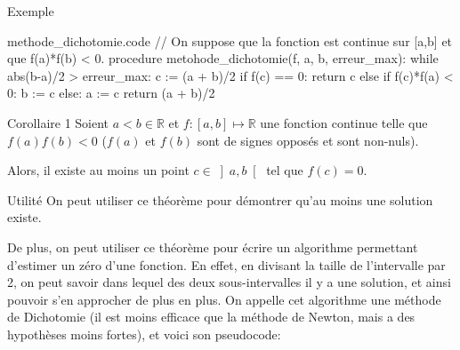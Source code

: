 \documentclass[a4paper]{article}
\begin{document}
\begin{parag}{Exemple}
\end{parag}

\begin{filecontents*}[overwrite]{methode_dichotomie.code}
// On suppose que la fonction est continue sur [a,b] et que f(a)*f(b) < 0.
procedure metohode_dichotomie(f, a, b, erreur_max):
    while abs(b-a)/2 > erreur_max:
        c := (a + b)/2
        if f(c) == 0: return c
        else if f(c)*f(a) < 0: b := c
        else: a := c
    return (a + b)/2
\end{filecontents*}


\begin{parag}{Corollaire 1}
    Soient $a < b \in \mathbb{R}$ et $f: \left[a,b\right] \mapsto \mathbb{R}$ une fonction continue telle que $f\left(a\right)f\left(b\right) < 0$ ($f\left(a\right)$ et $f\left(b\right)$ sont de signes opposés et sont non-nuls).

    Alors, il existe au moins un point $c \in \left]a, b\right[ $ tel que $f\left(c\right) = 0$. 

    \begin{subparag}{Utilité}
        On peut utiliser ce théorème pour démontrer qu'au moins une solution existe.
        
        De plus, on peut utiliser ce théorème pour écrire un algorithme permettant d'estimer un zéro d'une fonction. En effet, en divisant la taille de l'intervalle par 2, on peut savoir dans lequel des deux sous-intervalles il y a une solution, et ainsi pouvoir s'en approcher de plus en plus. On appelle cet algorithme une méthode de Dichotomie (il est moins efficace que la méthode de Newton, mais a des hypothèses moins fortes), et voici son pseudocode:
       
    \end{subparag}
\end{parag}
\end{document}

